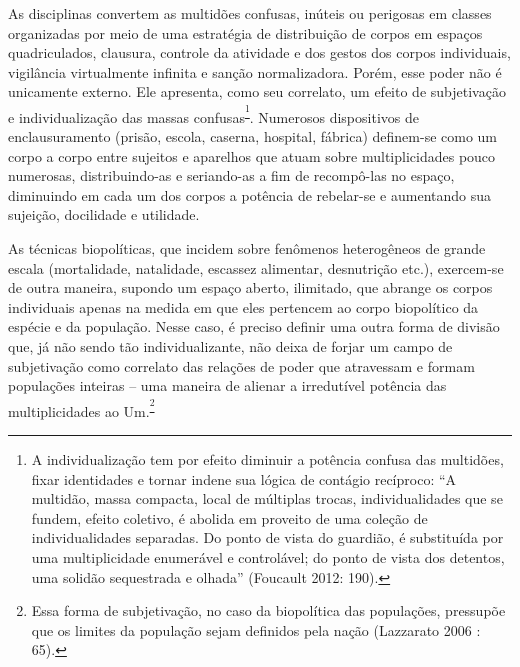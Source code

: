 As disciplinas convertem as multidões confusas, inúteis ou perigosas em
classes organizadas por meio de uma estratégia de distribuição de corpos
em espaços quadriculados, clausura, controle da atividade e dos gestos
dos corpos individuais, vigilância virtualmente infinita e sanção
normalizadora. Porém, esse poder não é unicamente externo. Ele
apresenta, como seu correlato, um efeito de subjetivação e
individualização das massas confusas\textsuperscript{\footnote{A
  individualização tem por efeito diminuir a potência confusa das
  multidões, fixar identidades e tornar indene sua lógica de contágio
  recíproco: ``A multidão, massa compacta, local de múltiplas trocas,
  individualidades que se fundem, efeito coletivo, é abolida em proveito
  de uma coleção de individualidades separadas. Do ponto de vista do
  guardião, é substituída por uma multiplicidade enumerável e
  controlável; do ponto de vista dos detentos, uma solidão sequestrada e
  olhada'' (Foucault 2012: 190).}}. Numerosos dispositivos de
enclausuramento (prisão, escola, caserna, hospital, fábrica) definem-se
como um corpo a corpo entre sujeitos e aparelhos que atuam sobre
multiplicidades pouco numerosas, distribuindo-as e seriando-as a fim de
recompô-las no espaço, diminuindo em cada um dos corpos a potência de
rebelar-se e aumentando sua sujeição, docilidade e utilidade.

As técnicas biopolíticas, que incidem sobre fenômenos heterogêneos de
grande escala (mortalidade, natalidade, escassez alimentar, desnutrição
etc.), exercem-se de outra maneira, supondo um espaço aberto, ilimitado,
que abrange os corpos individuais apenas na medida em que eles pertencem
ao corpo biopolítico da espécie e da população. Nesse caso, é preciso
definir uma outra forma de divisão que, já não sendo tão
individualizante, não deixa de forjar um campo de subjetivação como
correlato das relações de poder que atravessam e formam populações
inteiras -- uma maneira de alienar a irredutível potência das
multiplicidades ao Um.\textsuperscript{\footnote{Essa forma de
  subjetivação, no caso da biopolítica das populações, pressupõe que os
  limites da população sejam definidos pela nação (Lazzarato 2006 : 65).}}

